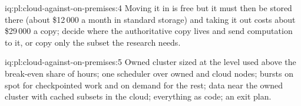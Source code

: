 \begin{solution}{iq:pl:cloud-against-on-premises:4}
Moving it in is free but it must then be stored there (about \$12\,000 a month in standard storage) and taking it out costs about \$29\,000 a
copy; decide where the authoritative copy lives and send computation to it, or copy only the subset the research needs.
\end{solution}

\begin{solution}{iq:pl:cloud-against-on-premises:5}
Owned cluster sized at the level used above the break-even share of hours; one scheduler over owned and cloud nodes; bursts on spot for
checkpointed work and on demand for the rest; data near the owned cluster with cached subsets in the cloud; everything as code; an exit plan.
\end{solution}
